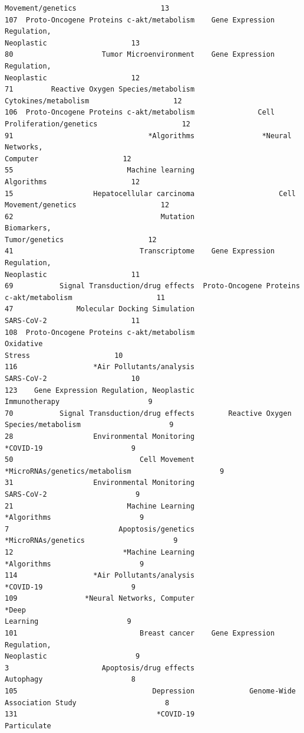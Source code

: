 \documentclass[11pt]{article}
\begin{document}
\begin{Verbatim}[commandchars=\\\{\}]
Movement/genetics                    13
107  Proto-Oncogene Proteins c-akt/metabolism    Gene Expression Regulation,
Neoplastic                    13
80                     Tumor Microenvironment    Gene Expression Regulation,
Neoplastic                    12
71         Reactive Oxygen Species/metabolism
Cytokines/metabolism                    12
106  Proto-Oncogene Proteins c-akt/metabolism               Cell
Proliferation/genetics                    12
91                                *Algorithms                *Neural Networks,
Computer                    12
55                           Machine learning
Algorithms                    12
15                   Hepatocellular carcinoma                    Cell
Movement/genetics                    12
62                                   Mutation                Biomarkers,
Tumor/genetics                    12
41                              Transcriptome    Gene Expression Regulation,
Neoplastic                    11
69           Signal Transduction/drug effects  Proto-Oncogene Proteins
c-akt/metabolism                    11
47               Molecular Docking Simulation
SARS-CoV-2                    11
108  Proto-Oncogene Proteins c-akt/metabolism                          Oxidative
Stress                    10
116                  *Air Pollutants/analysis
SARS-CoV-2                    10
123    Gene Expression Regulation, Neoplastic
Immunotherapy                     9
70           Signal Transduction/drug effects        Reactive Oxygen
Species/metabolism                     9
28                   Environmental Monitoring
*COVID-19                     9
50                              Cell Movement
*MicroRNAs/genetics/metabolism                     9
31                   Environmental Monitoring
SARS-CoV-2                     9
21                           Machine Learning
*Algorithms                     9
7                          Apoptosis/genetics
*MicroRNAs/genetics                     9
12                          *Machine Learning
*Algorithms                     9
114                  *Air Pollutants/analysis
*COVID-19                     9
109                *Neural Networks, Computer                            *Deep
Learning                     9
101                             Breast cancer    Gene Expression Regulation,
Neoplastic                     9
3                      Apoptosis/drug effects
Autophagy                     8
105                                Depression             Genome-Wide
Association Study                     8
131                                 *COVID-19               Particulate

\end{Verbatim}
\end{document}
